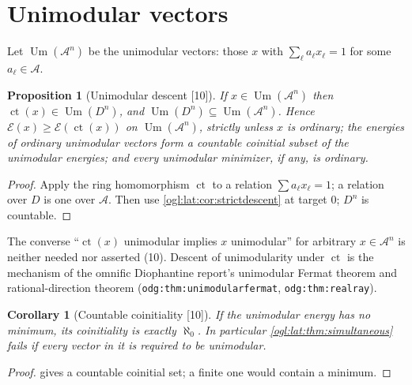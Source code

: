 \documentclass[11pt,oneside]{article}
\numberwithin{equation}{section}
\newtheorem{proposition}[proposition]{Proposition}
\newtheorem{corollary}[corollary]{Corollary}
\theoremstyle{definition}
\theoremstyle{remark}
\newcommand{\A}{\mathcal A}
\newcommand{\cE}{\mathcal E}
\newcommand{\ct}{\operatorname{ct}}
\newcommand{\Um}{\operatorname{Um}}
\newcommand{\src}[1]{\textup{\textsf{\small[#1]}}}
\newcommand{\replabel}[1]{\nolinkurl{#1}}
\begin{document}
\section{Unimodular vectors}\label{ogl:lat:sec:unimodular}

Let $\Um(\A^n)$ be the unimodular vectors: those $x$ with $\sum_\ell a_\ell x_\ell=1$
for some $a_\ell\in\A$.

\begin{proposition}[Unimodular descent \src{10}]\label{ogl:lat:prop:unidescent}
If $x\in\Um(\A^n)$ then $\ct(x)\in\Um(D^n)$, and $\Um(D^n)\subseteq\Um(\A^n)$.
Hence $\cE(x)\ge\cE(\ct(x))$ on $\Um(\A^n)$, strictly unless $x$ is ordinary; the
energies of ordinary unimodular vectors form a countable coinitial subset of the
unimodular energies; and every unimodular minimizer, if any, is ordinary.
\end{proposition}
\begin{proof}
Apply the ring homomorphism $\ct$ to a relation $\sum a_\ell x_\ell=1$; a relation
over $D$ is one over $\A$. Then use \cref{ogl:lat:cor:strictdescent} at target
$0$; $D^n$ is countable.
\end{proof}

The converse ``$\ct(x)$ unimodular implies $x$ unimodular'' for arbitrary
$x\in\A^n$ is neither needed nor asserted (10). Descent of unimodularity under
$\ct$ is the mechanism of the omnific Diophantine report's unimodular Fermat
theorem and rational-direction theorem
(\replabel{odg:thm:unimodularfermat}, \replabel{odg:thm:realray}).

\begin{corollary}[Countable coinitiality \src{10}]\label{ogl:lat:cor:unicountable}
If the unimodular energy has no minimum, its coinitiality is exactly $\aleph_0$.
In particular \cref{ogl:lat:thm:simultaneous} fails if every vector in it is
required to be unimodular.
\end{corollary}
\begin{proof}
 gives a countable coinitial set; a finite one
would contain a minimum.
\end{proof}
\end{document}
